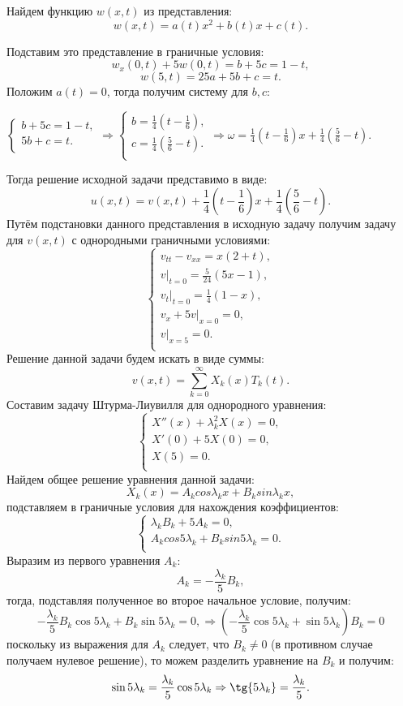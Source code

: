 \documentclass[11pt]{article}
\begin{document}
Найдем функцию $w(x,t)$ из представления:
$$w(x,t)=a(t)x^2+b(t)x+c(t).$$

Подставим это представление в граничные условия:
$$w_x(0,t)+5w(0,t)=b+5c=1-t,$$
$$w(5,t)=25a+5b+c=t.$$
Положим $a(t)=0$, тогда получим систему для $b, c$:
\begin{center}$
    \begin{cases}
        b+5c=1-t,\\
        5b+c=t.\\
    \end{cases} \Rightarrow 
    \begin{cases}
        b=\frac{1}{4}(t-\frac{1}{6}),\\
        c=\frac{1}{4}(\frac{5}{6}-t).\\
    \end{cases} \Rightarrow
    \omega = \frac{1}{4}(t-\frac{1}{6})x+\frac{1}{4}(\frac{5}{6}-t).
$\end{center}
Тогда решение исходной задачи представимо в виде:
$$u(x,t)=v(x,t)+\frac{1}{4}(t-\frac{1}{6})x+\frac{1}{4}(\frac{5}{6}-t).$$
Путём подстановки данного представления в исходную задачу получим задачу для $v(x,t)$ с однородными граничными условиями:
$$
        \begin{cases}
            v_{tt}-v_{xx}=x(2+t),\\
            v|_{t=0}=\frac{5}{24}(5x-1),\\
            v_t|_{t=0}=\frac{1}{4}(1-x),\\
            v_x+5v|_{x=0} = 0,\\
            v|_{x=5}=0.\\
        \end{cases}$$
Решение данной задачи будем искать в виде суммы:
$$v(x,t)=\sum^\infty_{k=0}X_k(x)T_k(t).$$
Составим задачу Штурма-Лиувилля для однородного уравнения:
$$\begin{cases}
    X''(x)+\lambda_k^2 X(x)=0,\\
    X'(0)+5X(0)=0,\\
    X(5)=0.\\
\end{cases}$$
Найдем общее решение уравнения данной задачи:
$$X_k(x)=A_kcos\lambda_kx+B_ksin\lambda_kx,$$
подставляем в граничные условия для нахождения коэффициентов:
$$\begin{cases}
    \lambda_kB_k+5A_k=0,\\
    A_kcos5\lambda_k+B_ksin5\lambda_k=0.\\
\end{cases}$$
Выразим из первого уравнения $A_k$: $$A_k = -\frac{\lambda_k}{5}B_k,$$ тогда, подставляя полученное во второе начальное условие, получим: $$-\frac{\lambda_k}{5}B_k\cos{5\lambda_k}+B_k\sin{5\lambda_k}=0, \Rightarrow (-\frac{\lambda_k}{5}\cos{5\lambda_k}+\sin{5\lambda_k})B_k=0$$ поскольку из выражения для $A_k$ следует, что $B_k \neq 0$ (в противном случае получаем нулевое решение), то можем разделить уравнение на $B_k$ и получим: $$\sin{5\lambda_k}=\frac{\lambda_k}{5}\cos{5\lambda_k} \Rightarrow \tg{5\lambda_k}=\frac{\lambda_k}{5}.$$ 
\end{document}
